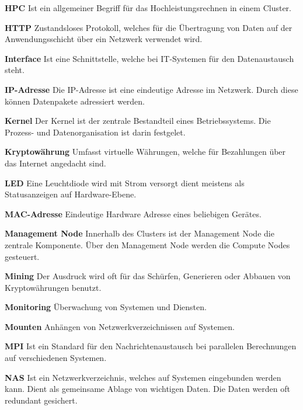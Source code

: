 \textbf{HPC}\newline
Ist ein allgemeiner Begriff für das Hochleistungsrechnen in einem Cluster.

\textbf{HTTP}\newline
Zustandsloses Protokoll, welches für die Übertragung von Daten auf der Anwendungsschicht über ein Netzwerk verwendet wird.

\textbf{Interface}\newline
Ist eine Schnittstelle, welche bei IT-Systemen für den Datenaustausch steht.

\textbf{IP-Adresse}\newline
Die IP-Adresse ist eine eindeutige Adresse im Netzwerk. Durch diese können Datenpakete adressiert werden. 

\textbf{Kernel}\newline
Der Kernel ist der zentrale Bestandteil eines Betriebssystems. Die Prozess- und Datenorganisation ist darin festgelet.

\textbf{Kryptowährung}\newline
Umfasst virtuelle Währungen, welche für Bezahlungen über das Internet angedacht sind.

\textbf{LED}\newline
Eine Leuchtdiode wird mit Strom versorgt dient meistens als Statusanzeigen auf Hardware-Ebene.

\textbf{MAC-Adresse}\newline 
Eindeutige Hardware Adresse eines beliebigen Gerätes.

\textbf{Management Node}\newline
Innerhalb des Clusters ist der Management Node die zentrale Komponente. Über den Management Node werden die Compute Nodes gesteuert.

\textbf{Mining}\newline
Der Ausdruck wird oft für das Schürfen, Generieren oder Abbauen von Kryptowährungen benutzt.

\textbf{Monitoring}\newline
Überwachung von Systemen und Diensten.

\textbf{Mounten}\newline
Anhängen von Netzwerkverzeichnissen auf Systemen.

\textbf{MPI}\newline
Ist ein Standard für den Nachrichtenaustausch bei parallelen Berechnungen auf verschiedenen Systemen. 

\textbf{NAS}\newline
Ist ein Netzwerkverzeichnis, welches auf Systemen eingebunden werden kann. Dient als gemeinsame Ablage von wichtigen Daten. Die Daten werden oft redundant gesichert. 

